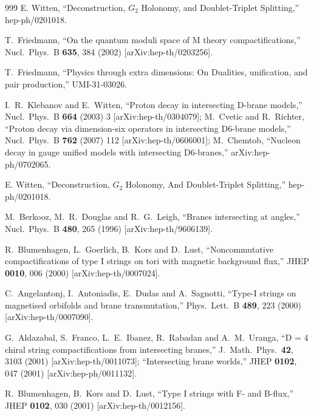 \begin{thebibliography}{999}
E. Witten, ``Deconstruction, $G_2$ Holonomy, and Doublet-Triplet
Splitting,'' hep-ph/0201018.

  T.~Friedmann,
  ``On the quantum moduli space of M theory compactifications,''
  Nucl.\ Phys.\ B {\bf 635}, 384 (2002)
  [arXiv:hep-th/0203256].

  T.~Friedmann,
  ``Physics through extra dimensions: On Dualities, unification, and pair
  production,''
UMI-31-03026.

  I.~R.~Klebanov and E.~Witten,
  ``Proton decay in intersecting D-brane models,''
  Nucl.\ Phys.\ B {\bf 664} (2003) 3
  [arXiv:hep-th/0304079];
M.~Cvetic and R.~Richter,
  ``Proton decay via dimension-six operators in intersecting D6-brane 
models,''
  Nucl.\ Phys.\  B {\bf 762} (2007) 112
  [arXiv:hep-th/0606001];
  M.~Chemtob,
  ``Nucleon decay in gauge unified models with intersecting D6-branes,''
  arXiv:hep-ph/0702065.


E. Witten, ``Deconstruction, $G_2$ Holonomy, And
Doublet-Triplet Splitting,'' hep-ph/0201018.

M.~Berkooz, M.~R.~Douglas and R.~G.~Leigh,
``Branes intersecting at angles,''
Nucl.\ Phys.\ B {\bf 480}, 265 (1996)
[arXiv:hep-th/9606139].

R.~Blumenhagen, L.~Goerlich, B.~Kors and D.~Lust,
``Noncommutative compactifications of type I strings on tori with  magnetic background flux,''
JHEP {\bf 0010}, 006 (2000)
[arXiv:hep-th/0007024].

C.~Angelantonj, I.~Antoniadis, E.~Dudas and A.~Sagnotti,
``Type-I strings on magnetised orbifolds and brane transmutation,''
Phys.\ Lett.\ B {\bf 489}, 223 (2000)
[arXiv:hep-th/0007090].

G.~Aldazabal, S.~Franco, L.~E.~Ibanez, R.~Rabadan and A.~M.~Uranga,
``D = 4 chiral string compactifications from intersecting branes,''
J.\ Math.\ Phys.\  {\bf 42}, 3103 (2001)
[arXiv:hep-th/0011073];
``Intersecting brane worlds,''
JHEP {\bf 0102}, 047 (2001)
[arXiv:hep-ph/0011132].

R.~Blumenhagen, B.~Kors and D.~Lust,
``Type I strings with F- and B-flux,''
JHEP {\bf 0102}, 030 (2001)
[arXiv:hep-th/0012156].


\end{thebibliography}
